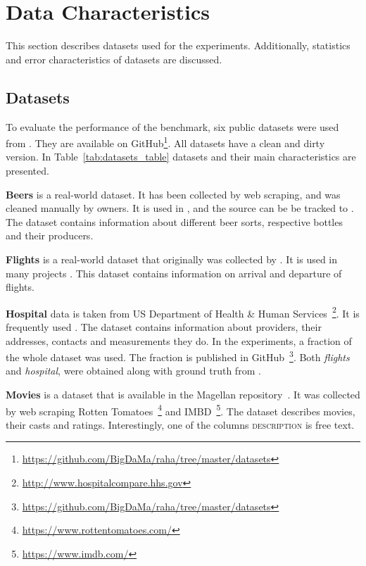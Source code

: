 \section{Data Characteristics}
\label{sec:data_charcteristics}

This section describes datasets used for the experiments.
Additionally, statistics and error characteristics of datasets are discussed.

\subsection{Datasets}



To evaluate the performance of the benchmark, six public datasets were used from \textcite{MahdaviAFMQST2019, MahdaviA2020}. 
They are available on GitHub\footnote{\url{https://github.com/BigDaMa/raha/tree/master/datasets}}.
All datasets have a clean and dirty version.
In Table~\ref{tab:datasets_table} datasets and their main characteristics are presented.

\textbf{Beers} is a real-world dataset. It has been collected by web scraping, and was cleaned manually by owners.
It is used in \textcite{MahdaviAFMQST2019, MahdaviA2020},
and the source can be be tracked to \textcite{Hould2017WEB, Hould2017KAGGLE}. 
The dataset contains information about different beer sorts, respective bottles and their producers.

\textbf{Flights} is a real-world dataset that originally was collected by \textcite{LiDLMS2015}. 
It is used in many projects \cite{HeidariMIR2019, raha, LiDLMS2015}.
This dataset contains information on arrival and departure of flights.

\textbf{Hospital} data is taken from US Department of Health \& Human Services~\footnote{\url{http://www.hospitalcompare.hhs.gov}}. 
It is frequently used \cite{RestatGCS2022, ChuIP2013, DallachiesaEEEIOT2013, HeidariMIR2019,MahdaviAFMQST2019, MahdaviA2020, RekatsinasCIR2017}.
The dataset contains information about providers, their addresses, contacts and measurements they do.
In the experiments, a fraction of the whole dataset was used.
The fraction is published in GitHub~\footnote{\url{https://github.com/BigDaMa/raha/tree/master/datasets}}.
Both \textit{flights} and \textit{hospital}, were obtained along with ground truth from \textcite{HeidariMIR2019}.

\textbf{Movies} is a dataset that is available in the Magellan repository~\cite{DasDGGKGP2016, KondaDSDABLPZNPKDR2016}.
It was collected by web scraping Rotten Tomatoes~\footnote{\url{https://www.rottentomatoes.com/}} and IMBD~\footnote{\url{https://www.imdb.com/}}.
The dataset describes movies, their casts and ratings. 
Interestingly, one of the columns \textsc{description} is free text.

